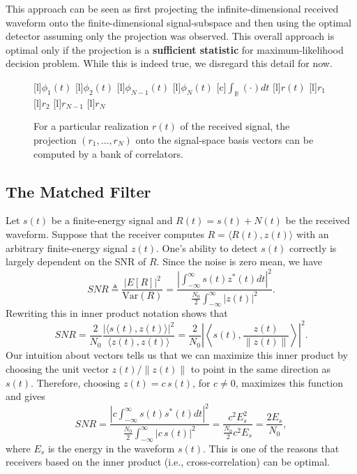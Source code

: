 This approach can be seen as first projecting the infinite-dimensional received waveform onto the finite-dimensional signal-subspace and then using the optimal detector assuming only the projection was observed.
This overall approach is optimal only if the projection is a \textbf{sufficient statistic} for maximum-likelihood decision problem.
While this is indeed true, we disregard this detail for now.

\begin{figure}
\begin{center}
\begin{psfrags}
[l]{$\phi_1(t)$}
[l]{$\phi_2(t)$}
[l]{$\phi_{N-1}(t)$}
[l]{$\phi_N(t)$}
[c]{$\int_{\mathbb{R}} (\cdot) dt$}
[l]{$r(t)$}
[l]{$r_1$}
[l]{$r_2$}
[l]{$r_{N-1}$}
[l]{$r_N$}
\end{psfrags}
\end{center}
\caption{For a particular realization $r(t)$ of the received signal, the projection $(r_1,\ldots,r_N)$ onto the signal-space basis vectors can be computed by a bank of correlators.}
\end{figure}

\subsection{The Matched Filter}

Let $s(t)$ be a finite-energy signal and $R(t)=s(t)+N(t)$ be the received waveform.
Suppose that the receiver computes $R = \langle R(t), z(t) \rangle$ with an arbitrary finite-energy signal $z(t)$.
One's ability to detect $s(t)$ correctly is largely dependent on the SNR of $R$.
Since the noise is zero mean, we have
\[ SNR \triangleq \frac{\left| E [ R ] \right|^2}{\mathrm{Var}(R)}
= \frac{\left|\int_{-\infty}^{\infty} s(t)z^* (t) dt \right|^2}{\frac{N_0}{2} \int_{-\infty}^{\infty} \left| z(t) \right|^2}. \]
Rewriting this in inner product notation shows that
\[ SNR = \frac{2}{N_0} \frac{\left| \langle s(t), z(t) \rangle \right|^2 }{\langle z(t) , z(t) \rangle}
= \frac{2}{N_0} \left| \left\langle s(t), \frac{z(t)}{\| z(t) \|} \right\rangle \right|^2. \]
Our intuition about vectors tells us that we can maximize this inner product by choosing the unit vector $z(t) / \| z(t) \|$ to point in the same direction as $s(t)$.
Therefore, choosing $z(t) = c \, s(t)$, for $c\neq 0$, maximizes this function and gives
\[ SNR = \frac{\left|c \int_{-\infty}^{\infty} s(t) s^* (t) dt \right|^2}{\frac{N_0}{2} \int_{-\infty}^{\infty} \left| c\, s(t) \right|^2}
= \frac{c^2 E_s^2}{\frac{N_0}{2} c^2 E_s}
= \frac{2 E_s}{N_0}, \]
where $E_s$ is the energy in the waveform $s(t)$.
This is one of the reasons that receivers based on the inner product (i.e., cross-correlation) can be optimal.


